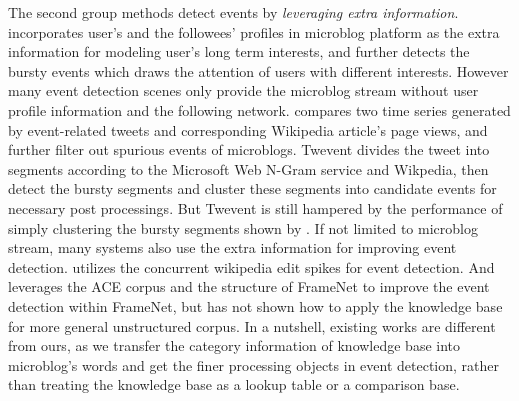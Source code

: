 \documentclass{article}
\begin{document}
The second group methods detect events by \textit{leveraging extra information}. 
\cite{huang2016efficient} incorporates user's and the followees' profiles in microblog platform as the extra information for modeling user's long term interests, and further detects the bursty events which draws the attention of users with different interests. 
However many event detection scenes only provide the microblog stream without user profile information and the following network.
\cite{osborne2012bieber} compares two time series generated by event-related tweets and corresponding Wikipedia article's page views, and further filter out spurious events of microblogs.
Twevent \cite{Twevent2012} divides the tweet into segments according to the Microsoft Web N-Gram service and Wikpedia, then detect the bursty segments and cluster these segments into candidate events for necessary post processings.
But Twevent is still hampered by the performance of simply clustering the bursty segments shown by \cite{Yan:2015wm}.
If not limited to microblog stream, many systems also use the extra information for improving event detection.
\cite{steiner2013mj} utilizes the concurrent wikipedia edit spikes for event detection.
And \cite{liuleveraging2016} leverages the ACE corpus\cite{doddington2004automatic} and the structure of FrameNet\cite{baker1998berkeley} to improve the event detection within FrameNet, but has not shown how to apply the knowledge base for more general unstructured corpus.
In a nutshell, existing works are different from ours, as we transfer the category information of knowledge base into microblog's words and get the finer processing objects in event detection, rather than treating the knowledge base as a lookup table or a comparison base.


\end{document}
